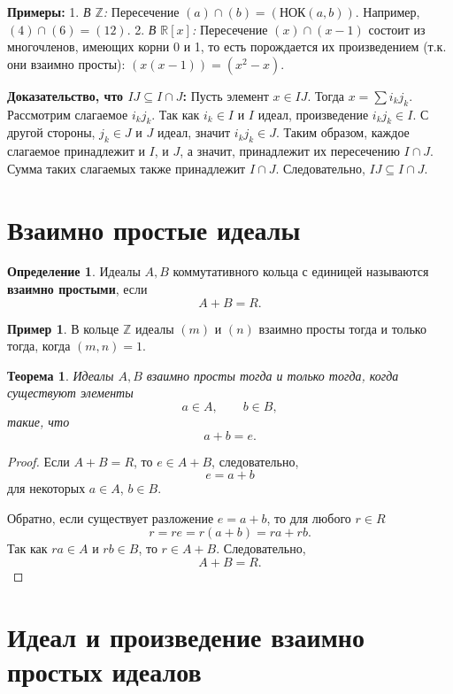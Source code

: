 \documentclass[12pt, a4paper]{article}
\newtheorem{theorem}{Теорема}
\theoremstyle{definition}
\newtheorem{definition}{Определение}
\newtheorem{example}{Пример}
\theoremstyle{remark}
\newcommand{\Z}{\mathbb{Z}}
\begin{document}
\textbf{Примеры:}
1. \textit{В $\mathbb{Z}$:} Пересечение $(a) \cap (b) = (\text{НОК}(a, b))$. Например, $(4) \cap (6) = (12)$.
2. \textit{В $\mathbb{R}[x]$:} Пересечение $(x) \cap (x-1)$ состоит из многочленов, имеющих корни 0 и 1, то есть порождается их произведением (т.к. они взаимно просты): $(x(x-1)) = (x^2 - x)$.

\textbf{Доказательство, что $IJ \subseteq I \cap J$:}
Пусть элемент $x \in IJ$. Тогда $x = \sum i_k j_k$.
Рассмотрим слагаемое $i_k j_k$. Так как $i_k \in I$ и $I$ идеал, произведение $i_k j_k \in I$. С другой стороны, $j_k \in J$ и $J$ идеал, значит $i_k j_k \in J$.
Таким образом, каждое слагаемое принадлежит и $I$, и $J$, а значит, принадлежит их пересечению $I \cap J$. Сумма таких слагаемых также принадлежит $I \cap J$. Следовательно, $IJ \subseteq I \cap J$.

\section{Взаимно простые идеалы}

\begin{definition}
	Идеалы $A,B$ коммутативного кольца с единицей называются \textbf{взаимно простыми}, если
	\[
	A+B=R.
	\]
\end{definition}

\begin{example}
	В кольце $\Z$ идеалы $(m)$ и $(n)$ взаимно просты тогда и только тогда, когда $(m,n)=1$.
\end{example}

\begin{theorem}
	Идеалы $A,B$ взаимно просты тогда и только тогда, когда существуют элементы
	\[
	a\in A,\qquad b\in B,
	\]
	такие, что
	\[
	a+b=e.
	\]
\end{theorem}

\begin{proof}
	Если $A+B=R$, то $e\in A+B$, следовательно,
	\[
	e=a+b
	\]
	для некоторых $a\in A$, $b\in B$.
	
	Обратно, если существует разложение $e=a+b$, то для любого $r\in R$
	\[
	r=re=r(a+b)=ra+rb.
	\]
	Так как $ra\in A$ и $rb\in B$, то $r\in A+B$. Следовательно,
	\[
	A+B=R.
	\]
\end{proof}

\section{Идеал и произведение взаимно простых идеалов}
\end{document}
